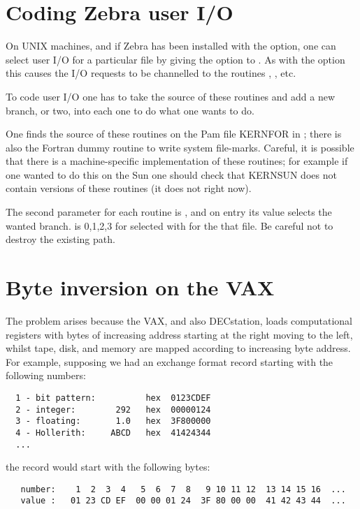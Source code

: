 \section{Coding Zebra user I/O}

On UNIX machines, and if Zebra has been installed with the
 option, one can select user I/O for a particular
file by giving the  option to .
As with the  option this causes the I/O requests to be
channelled to the routines , 
, etc.

To code user I/O one has to take the source of these
routines and add a new branch, or two, into each one
to do what one wants to do.

One finds the source of these routines on the Pam file
KERNFOR in ; there is also the Fortran dummy
routine  to write system file-marks.
Careful, it is possible that there is a machine-specific
implementation of these routines; for example if one
wanted to do this on the Sun one should check that
KERNSUN does not contain versions of these routines
(it does not right now).

The second parameter for each routine is ,
and on entry its value selects the wanted branch.
 is 0,1,2,3 for  selected 
with  for the that file.
Be careful not to destroy the existing path.

\section{Byte inversion on the VAX}

The problem arises because the VAX, and also DECstation,
loads computational registers with bytes of increasing address
starting at the right moving to the left, whilst tape, disk, and
memory are mapped according to increasing byte address.
For example, supposing we had an exchange format record
starting with the following numbers:

\begin{verbatim}
  1 - bit pattern:          hex  0123CDEF
  2 - integer:        292   hex  00000124
  3 - floating:       1.0   hex  3F800000
  4 - Hollerith:     ABCD   hex  41424344
  ...
\end{verbatim}

the record would start with the following bytes:

\begin{verbatim}
   number:    1  2  3  4   5  6  7  8   9 10 11 12  13 14 15 16  ...
   value :   01 23 CD EF  00 00 01 24  3F 80 00 00  41 42 43 44  ...
\end{verbatim}

